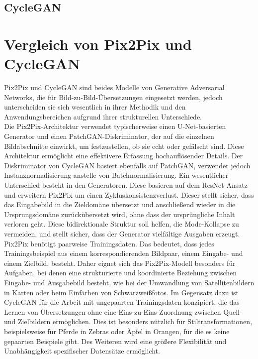 \subsection{CycleGAN}


\newpage
\section{Vergleich von Pix2Pix und CycleGAN}
Pix2Pix und CycleGAN sind beides Modelle von Generative Adversarial Networks, die für Bild-zu-Bild-Übersetzungen eingesetzt werden, jedoch unterscheiden sie sich wesentlich in ihrer Methodik und den Anwendungsbereichen aufgrund ihrer strukturellen Unterschiede.
\\\newline
Die Pix2Pix-Architektur verwendet typischerweise einen U-Net-basierten Generator und einen PatchGAN-Diskriminator, der auf die einzelnen Bildabschnitte einwirkt, um festzustellen, ob sie echt oder gefälscht sind. Diese Architektur ermöglicht eine effektivere Erfassung hochauflösender Details. 
Der Diskriminator von CycleGAN basiert ebenfalls auf PatchGAN, verwendet jedoch Instanznormalisierung anstelle von Batchnormalisierung. Ein wesentlicher Unterschied besteht in den Generatoren. Diese basieren auf dem ResNet-Ansatz und erweitern Pix2Pix um einen Zykluskonsistenzverlust. Dieser stellt sicher, dass das Eingabebild in die Zieldomäne übersetzt und anschließend wieder in die Ursprungsdomäne zurückübersetzt wird, ohne dass der ursprüngliche Inhalt verloren geht. Diese bidirektionale Struktur soll helfen, die Mode-Kollapse zu vermeiden, und stellt sicher, dass der Generator vielfältige Ausgaben erzeugt.
\\\newline
Pix2Pix benötigt paarweise Trainingsdaten. Das bedeutet, dass jedes Trainingsbeispiel aus einem korrespondierenden Bildpaar, einem Eingabe- und einem Zielbild, besteht. Daher eignet sich das Pix2Pix-Modell besonders für Aufgaben, bei denen eine strukturierte und koordinierte Beziehung zwischen Eingabe- und Ausgabebild besteht, wie bei der Umwandlung von Satellitenbildern in Karten oder beim Einfärben von Schwarzweißfotos. 
Im Gegensatz dazu ist CycleGAN für die Arbeit mit ungepaarten Trainingsdaten konzipiert, die das Lernen von Übersetzungen ohne eine Eins-zu-Eins-Zuordnung zwischen Quell- und Zielbildern ermöglichen. Dies ist besonders nützlich für Stiltransformationen, beispielsweise für Pferde in Zebras oder Äpfel in Orangen, für die es keine gepaarten Beispiele gibt. Des Weiteren wird eine größere Flexibilität und Unabhängigkeit spezifischer Datensätze ermöglicht.

